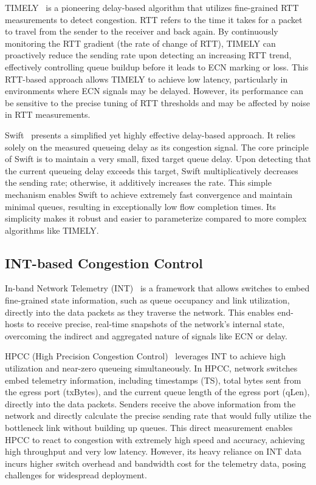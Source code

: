\documentclass[11pt,en]{elegantpaper}
\begin{document}
TIMELY~\cite{timely} is a pioneering delay-based algorithm that utilizes fine-grained RTT measurements to detect congestion. RTT refers to the time it takes for a packet to travel from the sender to the receiver and back again. By continuously monitoring the RTT gradient (the rate of change of RTT), TIMELY can proactively reduce the sending rate upon detecting an increasing RTT trend, effectively controlling queue buildup before it leads to ECN marking or loss. This RTT-based approach allows TIMELY to achieve low latency, particularly in environments where ECN signals may be delayed. However, its performance can be sensitive to the precise tuning of RTT thresholds and may be affected by noise in RTT measurements.

Swift~\cite{swift} presents a simplified yet highly effective delay-based approach. It relies solely on the measured queueing delay as its congestion signal. The core principle of Swift is to maintain a very small, fixed target queue delay. Upon detecting that the current queueing delay exceeds this target, Swift multiplicatively decreases the sending rate; otherwise, it additively increases the rate. This simple mechanism enables Swift to achieve extremely fast convergence and maintain minimal queues, resulting in exceptionally low flow completion times. Its simplicity makes it robust and easier to parameterize compared to more complex algorithms like TIMELY.

\subsection{INT-based Congestion Control}
\label{sec:int-based}

In-band Network Telemetry (INT)~\cite{int} is a framework that allows switches to embed fine-grained state information, such as queue occupancy and link utilization, directly into the data packets as they traverse the network. This enables end-hosts to receive precise, real-time snapshots of the network's internal state, overcoming the indirect and aggregated nature of signals like ECN or delay.

HPCC (High Precision Congestion Control)~\cite{hpcc} leverages INT to achieve high utilization and near-zero queueing simultaneously. In HPCC, network switches embed telemetry information, including timestamps (TS), total bytes sent from the egress port (txBytes), and the current queue length of the egress port (qLen), directly into the data packets. Senders receive the above information from the network and directly calculate the precise sending rate that would fully utilize the bottleneck link without building up queues. This direct measurement enables HPCC to react to congestion with extremely high speed and accuracy, achieving high throughput and very low latency. However, its heavy reliance on INT data incurs higher switch overhead and bandwidth cost for the telemetry data, posing challenges for widespread deployment.
\end{document}
